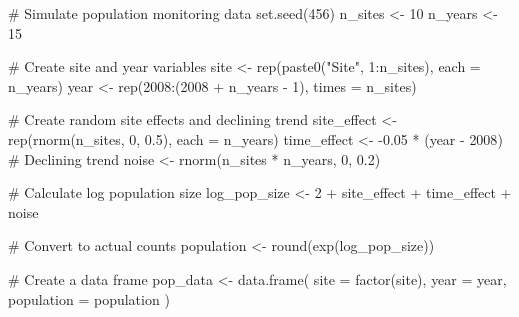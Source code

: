 \documentclass[
  letterpaper,
]{book}
\newenvironment{Shaded}{\begin{snugshade}}{\end{snugshade}}
\newcommand{\AttributeTok}[1]{\textcolor[rgb]{0.40,0.45,0.13}{#1}}
\newcommand{\CommentTok}[1]{\textcolor[rgb]{0.37,0.37,0.37}{#1}}
\newcommand{\DecValTok}[1]{\textcolor[rgb]{0.68,0.00,0.00}{#1}}
\newcommand{\FloatTok}[1]{\textcolor[rgb]{0.68,0.00,0.00}{#1}}
\newcommand{\FunctionTok}[1]{\textcolor[rgb]{0.28,0.35,0.67}{#1}}
\newcommand{\NormalTok}[1]{\textcolor[rgb]{0.00,0.23,0.31}{#1}}
\newcommand{\OtherTok}[1]{\textcolor[rgb]{0.00,0.23,0.31}{#1}}
\newcommand{\SpecialCharTok}[1]{\textcolor[rgb]{0.37,0.37,0.37}{#1}}
\newcommand{\StringTok}[1]{\textcolor[rgb]{0.13,0.47,0.30}{#1}}
\begin{document}
\begin{Shaded}
\begin{Highlighting}[]
\CommentTok{\# Simulate population monitoring data}
\FunctionTok{set.seed}\NormalTok{(}\DecValTok{456}\NormalTok{)}
\NormalTok{n\_sites }\OtherTok{\textless{}{-}} \DecValTok{10}
\NormalTok{n\_years }\OtherTok{\textless{}{-}} \DecValTok{15}

\CommentTok{\# Create site and year variables}
\NormalTok{site }\OtherTok{\textless{}{-}} \FunctionTok{rep}\NormalTok{(}\FunctionTok{paste0}\NormalTok{(}\StringTok{"Site"}\NormalTok{, }\DecValTok{1}\SpecialCharTok{:}\NormalTok{n\_sites), }\AttributeTok{each =}\NormalTok{ n\_years)}
\NormalTok{year }\OtherTok{\textless{}{-}} \FunctionTok{rep}\NormalTok{(}\DecValTok{2008}\SpecialCharTok{:}\NormalTok{(}\DecValTok{2008} \SpecialCharTok{+}\NormalTok{ n\_years }\SpecialCharTok{{-}} \DecValTok{1}\NormalTok{), }\AttributeTok{times =}\NormalTok{ n\_sites)}

\CommentTok{\# Create random site effects and declining trend}
\NormalTok{site\_effect }\OtherTok{\textless{}{-}} \FunctionTok{rep}\NormalTok{(}\FunctionTok{rnorm}\NormalTok{(n\_sites, }\DecValTok{0}\NormalTok{, }\FloatTok{0.5}\NormalTok{), }\AttributeTok{each =}\NormalTok{ n\_years)}
\NormalTok{time\_effect }\OtherTok{\textless{}{-}} \SpecialCharTok{{-}}\FloatTok{0.05} \SpecialCharTok{*}\NormalTok{ (year }\SpecialCharTok{{-}} \DecValTok{2008}\NormalTok{)  }\CommentTok{\# Declining trend}
\NormalTok{noise }\OtherTok{\textless{}{-}} \FunctionTok{rnorm}\NormalTok{(n\_sites }\SpecialCharTok{*}\NormalTok{ n\_years, }\DecValTok{0}\NormalTok{, }\FloatTok{0.2}\NormalTok{)}

\CommentTok{\# Calculate log population size}
\NormalTok{log\_pop\_size }\OtherTok{\textless{}{-}} \DecValTok{2} \SpecialCharTok{+}\NormalTok{ site\_effect }\SpecialCharTok{+}\NormalTok{ time\_effect }\SpecialCharTok{+}\NormalTok{ noise}

\CommentTok{\# Convert to actual counts}
\NormalTok{population }\OtherTok{\textless{}{-}} \FunctionTok{round}\NormalTok{(}\FunctionTok{exp}\NormalTok{(log\_pop\_size))}

\CommentTok{\# Create a data frame}
\NormalTok{pop\_data }\OtherTok{\textless{}{-}} \FunctionTok{data.frame}\NormalTok{(}
  \AttributeTok{site =} \FunctionTok{factor}\NormalTok{(site),}
  \AttributeTok{year =}\NormalTok{ year,}
  \AttributeTok{population =}\NormalTok{ population}
\NormalTok{)}


\end{Highlighting}
\end{Shaded}
\end{document}
